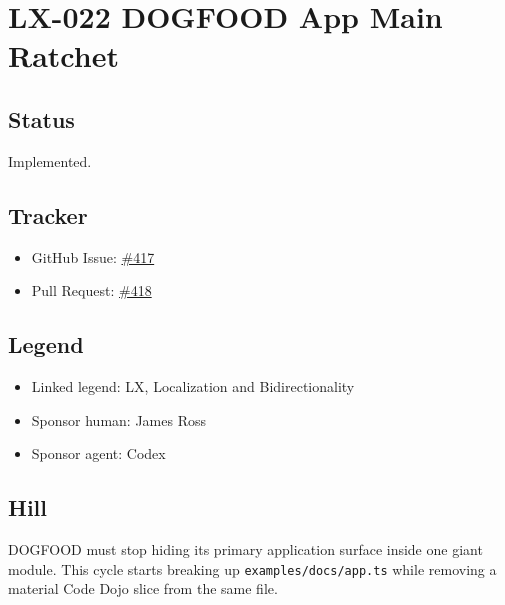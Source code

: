\chapter{LX-022 DOGFOOD App Main Ratchet}\label{record-198}

\smallskip

\section{Status}\label{record-198-status}

Implemented.

\section{Tracker}\label{record-198-tracker}

\begin{itemize}
\tightlist
\item
  GitHub Issue: \href{https://github.com/flyingrobots/bijou/issues/417}{\#417}
\item
  Pull Request: \href{https://github.com/flyingrobots/bijou/pull/418}{\#418}
\end{itemize}

\section{Legend}\label{record-198-legend}

\begin{itemize}
\tightlist
\item
  Linked legend: LX, Localization and Bidirectionality
\item
  Sponsor human: James Ross
\item
  Sponsor agent: Codex
\end{itemize}

\section{Hill}\label{record-198-hill}

DOGFOOD must stop hiding its primary application surface inside one giant module. This cycle starts breaking up \texttt{e\allowbreak{}x\allowbreak{}a\allowbreak{}m\allowbreak{}p\allowbreak{}l\allowbreak{}e\allowbreak{}s\allowbreak{}/\allowbreak{}d\allowbreak{}o\allowbreak{}c\allowbreak{}s\allowbreak{}/\allowbreak{}a\allowbreak{}p\allowbreak{}p\allowbreak{}.\allowbreak{}t\allowbreak{}s} while removing a material Code Dojo slice from the same file.

